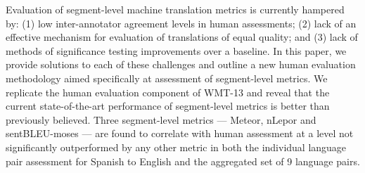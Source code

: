 Evaluation of segment-level machine translation metrics is currently hampered by: (1) low inter-annotator agreement levels in human assessments; (2) lack of an effective mechanism for evaluation of translations of equal quality; and (3) lack of methods of significance testing improvements over a baseline.  In this paper, we provide solutions to each of these challenges and outline a new human evaluation methodology aimed specifically at assessment of segment-level metrics.  We replicate the human evaluation component of WMT-13 and reveal that the current state-of-the-art performance of segment-level metrics is better than previously believed.  Three segment-level metrics --- Meteor, nLepor and sentBLEU-moses --- are found to correlate with human assessment at a level not significantly outperformed by any other metric in both the individual language pair assessment for Spanish to English and the aggregated set of 9 language pairs.
